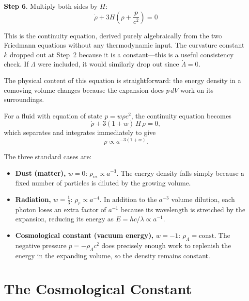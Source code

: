 \noindent\textbf{Step 6.} Multiply both sides by $H$:
\begin{equation}
    \boxed{\;
    \dot{\rho} + 3H\!\left(\rho + \frac{p}{c^{2}}\right) = 0
    \;}
    \label{eq:continuity_derived}
\end{equation}

This is the continuity equation, derived purely algebraically from the two Friedmann equations without any thermodynamic input. The curvature constant $k$ dropped out at Step~2 because it is a constant---this is a useful consistency check. If $\Lambda$ were included, it would similarly drop out since $\dot{\Lambda}=0$.

The physical content of this equation is straightforward: the energy density in a comoving volume changes because the expansion does $p\,dV$ work on its surroundings.

For a fluid with equation of state $p = w\rho c^{2}$, the continuity equation becomes
\begin{equation}
    \dot{\rho} + 3(1+w)\,H\,\rho = 0,
\end{equation}
which separates and integrates immediately to give
\begin{equation}
    \rho \propto a^{-3(1+w)}.
    \label{eq:rho_scaling}
\end{equation}

The three standard cases are:
\begin{itemize}
    \item \textbf{Dust (matter),} $w = 0$: $\rho_{m} \propto a^{-3}$. The energy density falls simply because a fixed number of particles is diluted by the growing volume.
    \item \textbf{Radiation,} $w = \tfrac{1}{3}$: $\rho_{r} \propto a^{-4}$. In addition to the $a^{-3}$ volume dilution, each photon loses an extra factor of $a^{-1}$ because its wavelength is stretched by the expansion, reducing its energy as $E = hc/\lambda \propto a^{-1}$.
    \item \textbf{Cosmological constant (vacuum energy),} $w = -1$: $\rho_{\Lambda} = \mathrm{const}$. The negative pressure $p = -\rho_{\Lambda}c^{2}$ does precisely enough work to replenish the energy in the expanding volume, so the density remains constant.
\end{itemize}


\section{The Cosmological Constant}

